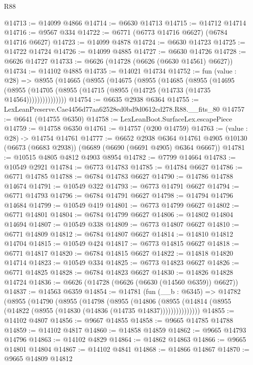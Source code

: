 \begin{lexlean}{R88}
\begin{coremodule}
@14713 := @14099 @4866
@14714 := @6630 @14713
@14715 := @14712 @14714
@14716 := @9567 @334
@14722 := @6771 (@6773 @14716 @6627) (@6784 @14716 @6627)
@14723 := @14099 @4878
@14724 := @6630 @14723
@14725 := @14722 @14724
@14726 := @14099 @4885
@14727 := @6630 @14726
@14728 := @6626 @14727
@14733 := @6626 (@14728 (@6626 (@6630 @14561) @6627))
@14734 := @14102 @4885
@14735 := @14021 @14734
@14752 := fun (value : @28) =>
  @8955
    (@14665
      (@8955
        (@14675
          (@8955
            (@14685
              (@8955
                (@14695
                  (@8955 (@14705 (@8955 (@14715 (@8955 (@14725 (@14733 (@14735 @14564)))))))))))))))
@14754 := @6635 @2938 @6364
@14755 := LexLeanPreserve.Cae4456d77aa62528ed0bd9d0612cd278.R88.__fits_80
@14757 := @6641 (@14755 @6350)
@14758 := LexLeanBoot.SurfaceLex.escapePiece
@14759 := @14758 @6350
@14761 := @14757 (@200 @14759)
@14763 := (value : @28) -> @14754 @14761
@14777 := @6652
    @2938
    @6364
    @14761
    @4905
    @10130
    (@6673 (@6683 @2938))
    (@6689 (@6690 (@6691 @4905) @6364 @6667))
@14781 := @10515 @4805 @4812 @4903 @8954
@14782 := @7799 @14664
@14783 := @10549 @2921
@14784 := @6773 @14783
@14785 := @14784 @6627
@14786 := @6771 @14785
@14788 := @6784 @14783 @6627
@14790 := @14786 @14788 @14674
@14791 := @10549 @322
@14793 := @6773 @14791 @6627
@14794 := @6771 @14793
@14796 := @6784 @14791 @6627
@14798 := @14794 @14796 @14684
@14799 := @10549 @419
@14801 := @6773 @14799 @6627
@14802 := @6771 @14801
@14804 := @6784 @14799 @6627
@14806 := @14802 @14804 @14694
@14807 := @10549 @338
@14809 := @6773 @14807 @6627
@14810 := @6771 @14809
@14812 := @6784 @14807 @6627
@14814 := @14810 @14812 @14704
@14815 := @10549 @424
@14817 := @6773 @14815 @6627
@14818 := @6771 @14817
@14820 := @6784 @14815 @6627
@14822 := @14818 @14820 @14714
@14823 := @10549 @334
@14825 := @6773 @14823 @6627
@14826 := @6771 @14825
@14828 := @6784 @14823 @6627
@14830 := @14826 @14828 @14724
@14836 := @6626 (@14728 (@6626 (@6630 (@14560 @6359)) @6627))
@14837 := @14563 @6359
@14854 := @14781
    (fun (__b : @6345) =>
    @14782
      (@8955
        (@14790
          (@8955
            (@14798
              (@8955
                (@14806
                  (@8955 (@14814 (@8955 (@14822 (@8955 (@14830 (@14836 (@14735 @14837)))))))))))))))
@14855 := @14102 @4807
@14856 := @9667 @14855
@14858 := @9665 @14785 @14788
@14859 := @14102 @4817
@14860 := @14858 @14859
@14862 := @9665 @14793 @14796
@14863 := @14102 @4829
@14864 := @14862 @14863
@14866 := @9665 @14801 @14804
@14867 := @14102 @4841
@14868 := @14866 @14867
@14870 := @9665 @14809 @14812

\end{coremodule}
\end{lexlean}
